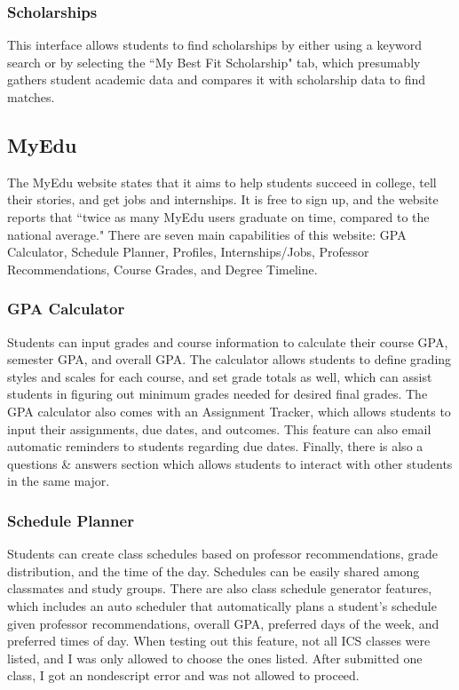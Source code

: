 \subsubsection{Scholarships}
This interface allows students to find scholarships by either using a keyword search or by selecting the ``My Best Fit Scholarship" tab, which presumably gathers student academic data and compares it with scholarship data to find matches.

\subsection{MyEdu} 
The MyEdu website states that it aims to help students succeed in college, tell their stories, and get jobs and internships. It is free to sign up, and the website reports that ``twice as many MyEdu users graduate on time, compared to the national average." There are seven main capabilities of this website: GPA Calculator, Schedule Planner, Profiles, Internships/Jobs, Professor Recommendations, Course Grades, and Degree Timeline.
\subsubsection{GPA Calculator}
Students can input grades and course information to calculate their course GPA, semester GPA, and overall GPA. The calculator allows students to define grading styles and scales for each course, and set grade totals as well, which can assist students in figuring out minimum grades needed for desired final grades. The GPA calculator also comes with an Assignment Tracker, which allows students to input their assignments, due dates, and outcomes. This feature can also email automatic reminders to students regarding due dates. Finally, there is also a questions \& answers section which allows students to interact with other students in the same major. 
\subsubsection{Schedule Planner}
Students can create class schedules based on professor recommendations, grade distribution, and the time of the day. Schedules can be easily shared among classmates and study groups. There are also class schedule generator features, which includes an auto scheduler that automatically plans a student's schedule given professor recommendations, overall GPA, preferred days of the week, and preferred times of day.  When testing out this feature, not all ICS classes were listed, and I was only allowed to choose the ones listed. After submitted one class, I got an nondescript error and was not allowed to proceed.
